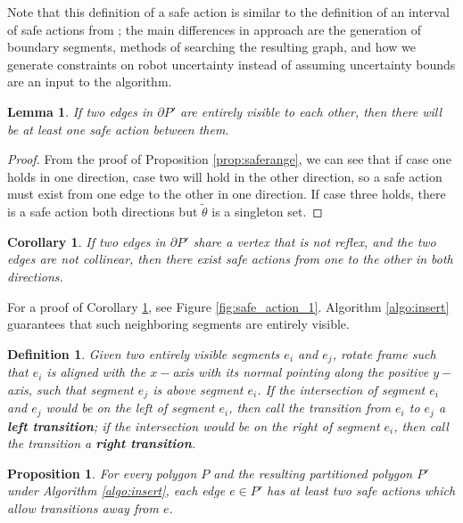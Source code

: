 \documentclass[]{article}
\newtheorem{proposition}{Proposition}
\newtheorem{definition}{Definition}
\newtheorem{corollary}{Corollary}
\newtheorem{lemma}{Lemma}
\begin{document}
Note that this definition of a safe action is similar to the definition of an interval of
safe actions from \cite{LewOKa13}; the main differences in approach are the
generation of boundary segments, methods of searching the resulting graph, and
how we generate constraints on robot uncertainty instead of assuming uncertainty
bounds are an input to the algorithm.

\begin{lemma} \label{lem:action}
If two edges in $\partial P'$ are entirely visible to each other, then there will be at least one safe
action between them.
\end{lemma}

\begin{proof}
From the proof of Proposition \ref{prop:saferange}, we can see that if case one
holds in one direction, case two will hold in the other direction, so a safe
action must exist from one edge to the other in one direction. If case three
holds, there is a safe action both directions but $\tilde{\theta}$ is a
singleton set.
\end{proof}


\begin{corollary} \label{coro:neighbor}
If two edges in $\partial P'$ share a vertex that is not reflex, and the two
 edges are not collinear, then there exist safe actions
from one to the other in both directions.
\end{corollary}

For a proof of Corollary \ref{coro:neighbor}, see Figure \ref{fig:safe_action_1}.
Algorithm \ref{algo:insert} guarantees that such neighboring segments are
entirely visible.

\begin{definition}
Given two entirely visible segments $e_i$ and $e_j$,
rotate frame such that $e_i$ is aligned with the $x-$axis with its normal pointing
along the positive $y-$axis, such that 
segment $e_j$ is above segment $e_i$. If the intersection of segment $e_i$ and
$e_j$ would be on the left of segment $e_i$, then call the transition from $e_i$ to $e_j$ a
\textbf{left
transition}; if the intersection would be on the right of segment $e_i$, then call the
transition a \textbf{right transition}.
\end{definition}

\begin{proposition} \label{prop:twosafe}
For every polygon $P$ and the resulting partitioned polygon $P'$ under Algorithm
\ref{algo:insert}, each edge $e \in P'$ has at least two safe actions which allow
transitions away from $e$.
\end{proposition}
\end{document}
